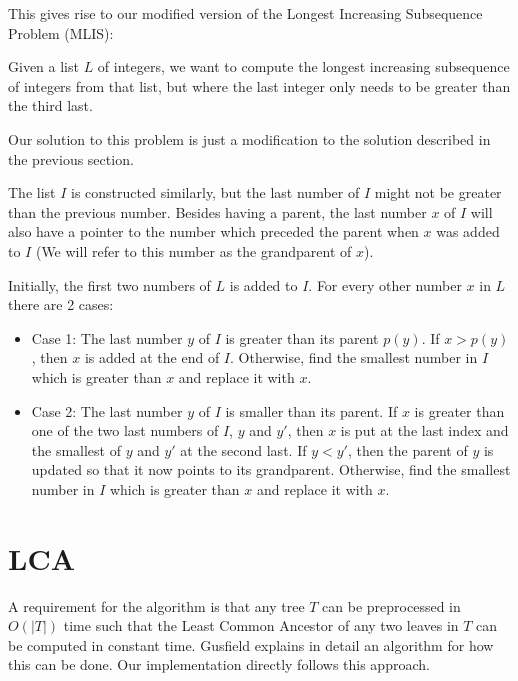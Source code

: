 This gives rise to our modified version of the Longest Increasing Subsequence Problem (MLIS):

Given a list $L$ of integers, we want to compute the longest increasing subsequence of integers from that list, but where the last integer only needs to be greater than the third last.

Our solution to this problem is just a modification to the solution described in the previous section.

The list $I$ is constructed similarly, but the last number of $I$ might not be greater than the previous number. Besides having a parent, the last number $x$ of $I$ will also have a pointer to the number which preceded the parent when $x$ was added to $I$ (We will refer to this number as the grandparent of $x$).

Initially, the first two numbers of $L$ is added to $I$. For every other number $x$ in $L$ there are 2 cases:

\begin{itemize}
	\item Case 1: The last number $y$ of $I$ is greater than its parent $p(y)$.
	\subitem If $x > p(y)$, then $x$ is added at the end of $I$.
	\subitem Otherwise, find the smallest number in $I$ which is greater than $x$ and replace it with $x$.
	\item Case 2: The last number $y$ of $I$ is smaller than its parent.
	\subitem If $x$ is greater than one of the two last numbers of $I$, $y$ and $y'$, then $x$ is put at the last index and the smallest of $y$ and $y'$ at the second last.
	\subsubitem If $y < y'$, then the parent of $y$ is updated so that it now points to its grandparent.
	\subitem Otherwise, find the smallest number in $I$ which is greater than $x$ and replace it with $x$.
\end{itemize}


\section{LCA}
A requirement for the algorithm is that any tree $T$ can be preprocessed in $O(|T|)$ time such that the Least Common Ancestor of any two leaves in $T$ can be computed in constant time. Gusfield  explains in detail an algorithm for how this can be done. Our implementation directly follows this approach.

